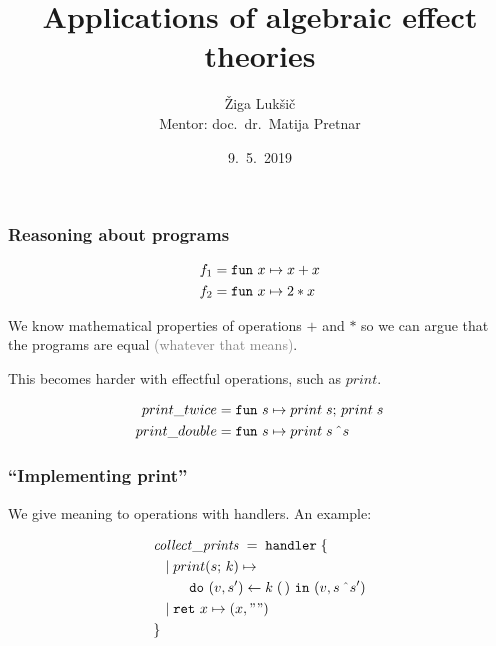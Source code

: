 \documentclass[usenames,dvipsnames]{beamer}
\title[Applications of algebraic effect theories]{\LARGE Applications of algebraic effect theories}
\author[Žiga Lukšič]{Žiga Lukšič \\ Mentor: doc.\ dr.\ Matija Pretnar}
\date{9.\ 5.\ 2019}
\begin{document}
\begin{frame}
  \titlepage
\end{frame}
\begin{frame}
	\frametitle{Reasoning about programs}
	
  \begin{align*}
		f_1 =& \;\mathtt{fun}~{x} \mapsto{x + x}\\
		f_2 =& \;\mathtt{fun}~{x} \mapsto{2*x}
	\end{align*}

	We know mathematical properties of operations $+$ and $*$ so we can argue that the programs are equal \textcolor{gray}{(whatever that means)}.
	\pause
	
	\vspace{5mm}
	

	This becomes harder with effectful operations, such as $print$.

	\begin{align*}
		print\_twice =& \;\mathtt{fun}~{s} \mapsto{{print}\;{s};\,{print}\;{s}}\\
		print\_double =& \;\mathtt{fun}~{s} \mapsto{{print}\;{s \, \;\hat{}\;s}}
	\end{align*}


\end{frame}
\begin{frame}
	\frametitle{``Implementing print''}
	
	We give meaning to operations with handlers. An example:

	\begin{align*}
		&\mathit{collect\_prints} \; = \; \keyhandler \; \{ \\
		&\tab | \; \operation[print]{s}{k} \mapsto \\
		&\tab \tab \tab \betterdobind{(v, s')}{\apply{k}{\unit}}(v, s\,\concat s')\\
		&\tab | \; \return{x} \mapsto (x, "") \\
		&\}
	\end{align*}

\end{frame}
\end{document}
